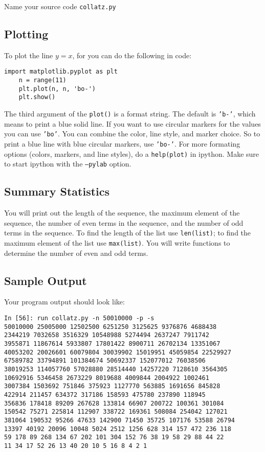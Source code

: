 \documentclass[12pt]{article}
\begin{document}
\begin{enumerate}
  Name your source code \texttt{collatz.py}
  
  \subsection*{Plotting}

  To plot the line $y = x$, for you can do the following in code:

  \begin{lstlisting}[style=c]
    import matplotlib.pyplot as plt
    n = range(11)
    plt.plot(n, n, 'bo-')
    plt.show()
  \end{lstlisting}

  The third argument of the \texttt{plot()} is a format string. The default is \texttt{'b-'}, which means to print a blue solid line. If you want to use circular markers for the values you can use \texttt{'bo'}. You can combine the color, line style, and marker choice. So to print a blue line with blue circular markers, use \texttt{'bo-'}. For more formating options (colors, markers, and line styles), do a \texttt{help(plot)} in ipython. Make sure to start ipython with the \texttt{--pylab} option.

  \subsection*{Summary Statistics}

  You will print out the length of the sequence, the maximum element of the sequence, the number of even terms in the sequence, and the number of odd terms in the sequence. To find the length of the list use \texttt{len(list)}; to find the maximum element of the list use \texttt{max(list)}. You will write functions to determine the number of even and odd terms.

  \subsection*{Sample Output}

  Your program output should look like:

  \begin{lstlisting}[style=bash]
In [56]: run collatz.py -n 50010000 -p -s
50010000 25005000 12502500 6251250 3125625 9376876 4688438 
2344219 7032658 3516329 10548988 5274494 2637247 7911742 
3955871 11867614 5933807 17801422 8900711 26702134 13351067 
40053202 20026601 60079804 30039902 15019951 45059854 22529927 
67589782 33794891 101384674 50692337 152077012 76038506 
38019253 114057760 57028880 28514440 14257220 7128610 3564305 
10692916 5346458 2673229 8019688 4009844 2004922 1002461 
3007384 1503692 751846 375923 1127770 563885 1691656 845828 
422914 211457 634372 317186 158593 475780 237890 118945 
356836 178418 89209 267628 133814 66907 200722 100361 301084 
150542 75271 225814 112907 338722 169361 508084 254042 127021 
381064 190532 95266 47633 142900 71450 35725 107176 53588 26794 
13397 40192 20096 10048 5024 2512 1256 628 314 157 472 236 118 
59 178 89 268 134 67 202 101 304 152 76 38 19 58 29 88 44 22 
11 34 17 52 26 13 40 20 10 5 16 8 4 2 1 


\end{lstlisting}
\end{enumerate}
\end{document}
